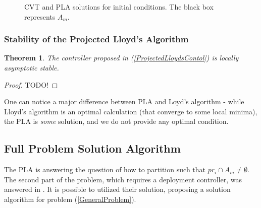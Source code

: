 \documentclass{iacas}
\newtheorem{theorem}{Theorem}
\begin{document}
\begin{figure}
	\captionsetup[subfigure]{position=b}
	\centering
	\caption{CVT and PLA solutions for initial conditions. The black box represents $A_m$.}
\label{fig:Voronoi_tessellation_illustration}
\end{figure}

\subsubsection*{Stability of the Projected Lloyd's Algorithm}
\begin{theorem}
The controller proposed in (\ref{ProjectedLloydsContol}) is locally asymptotic stable.
\end{theorem}

\begin{proof}
TODO!
\end{proof}

One can notice a major difference between PLA and Loyd's algorithm - while Lloyd's algorithm is an optimal calculation (that converge to some local minima), the PLA is \emph{some} solution, and we do not provide any optimal condition.

\subsection{Full Problem Solution Algorithm}
The PLA is answering the question of how to partition such that $pr_i \cap A_m \neq \emptyset$. The second part of the problem, which requires a deployment controller, was answered in \cite{Cortes2004}. It is possible to utilized their solution, proposing a solution algorithm for problem (\ref{GeneralProblem}).
\end{document}
